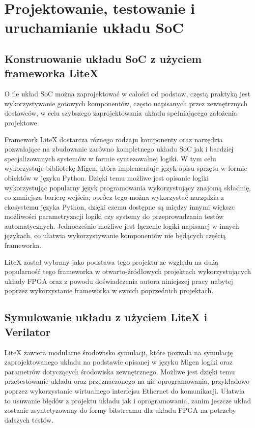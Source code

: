 \section{Projektowanie, testowanie i uruchamianie układu SoC}

\subsection{Konstruowanie układu SoC z użyciem frameworka LiteX}

O ile układ SoC można zaprojektować w całości od podstaw, częstą praktyką jest wykorzystywanie gotowych komponentów, często napisanych przez zewnętrznych dostawców, w celu szybszego zaprojektowania układu spełniającego założenia projektowe.

Framework LiteX\cite{https://doi.org/10.48550/arxiv.2005.02506} dostarcza różnego rodzaju komponenty oraz narzędzia pozwalające na zbudowanie zarówno kompletnego układu SoC jak i bardziej specjalizowanych systemów w formie syntezowalnej logiki. W tym celu wykorzystuje bibliotekę Migen\cite{migen:2016:Online}, która implementuje język opisu sprzętu w formie obiektów w języku Python\cite{10.5555/1593511}. Dzięki temu możliwe jest opisanie logiki wykorzystując popularny język programowania wykorzystujący znajomą składnię, co zmniejsza barierę wejścia; oprócz tego można wykorzystać narzędzia z ekosystemu języka Python, dzięki czemu dostępne są między innymi większe możliwości parametryzacji logiki czy systemy do przeprowadzania testów automatycznych. Jednocześnie możliwe jest łączenie logiki napisanej w innych językach, co ułatwia wykorzystywanie komponentów nie będących częścią frameworka.


LiteX został wybrany jako podstawa tego projektu ze względu na dużą popularność tego frameworka w otwarto-źródłowych projektach wykorzystujących układy FPGA oraz z powodu doświadczenia autora niniejszej pracy nabytej poprzez wykorzystanie frameworka w swoich poprzednich projektach.

\subsection{Symulowanie układu z użyciem LiteX i Verilator}

LiteX zawiera modularne środowisko symulacji, które pozwala na symulację zaprojektowanego układu na podstawie opisanej w języku Migen logiki oraz parametrów dotyczących środowiska zewnętrznego. Możliwe jest dzięki temu przetestowanie układu oraz przeznaczonego na nie oprogramowania, przykładowo poprzez wykorzystanie wirtualnego interfejsu Ethernet do komunikacji. Ułatwia to usuwanie błędów z projektu układu jak i oprogramowania, zanim jeszcze układ zostanie zsyntetyzowany do formy bitstreamu dla układu FPGA na potrzeby dalszych testów.

